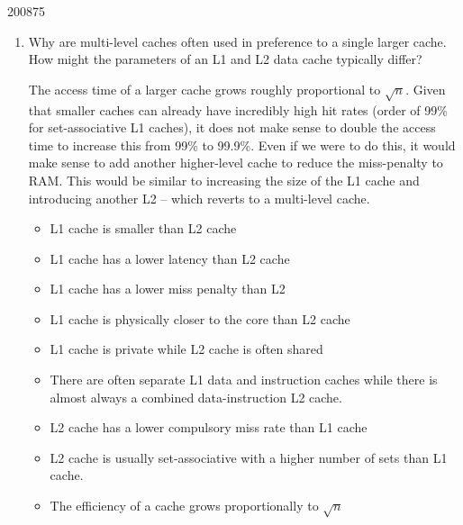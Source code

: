 \documentclass[10pt,\jkfside,a4paper]{article}
\begin{document}
\begin{examquestion}{2008}{7}{5}

\begin{enumerate}[label=(\alph*)]

\item Why are multi-level caches often used in preference to a single larger
cache. How might the parameters of an L1 and L2 data cache typically differ?

The access time of a larger cache grows roughly proportional to $\sqrt{n}$.
Given that smaller caches can already have incredibly high hit rates
(order of 99\% for set-associative L1 caches), it does not make sense to double
the access time to increase this from 99\% to 99.9\%. Even if we were to do
this, it would make sense to add another higher-level cache to reduce the
miss-penalty to RAM. This would be similar to increasing the size of the L1
cache and introducing another L2 -- which reverts to a multi-level cache.

\begin{itemize}

\item L1 cache is smaller than L2 cache

\item L1 cache has a lower latency than L2 cache

\item L1 cache has a lower miss penalty than L2

\item L1 cache is physically closer to the core than L2 cache

\item L1 cache is private while L2 cache is often shared

\item There are often separate L1 data and instruction caches while there is
almost always a combined data-instruction L2 cache.

\item L2 cache has a lower compulsory miss rate than L1 cache

\item L2 cache is usually set-associative with a higher number of sets than
L1 cache.

\end{itemize}

\iffalse

\begin{itemize}

\item The efficiency of a cache grows proportionally to $\sqrt{n}$


\end{itemize}
\end{enumerate}
\end{examquestion}
\end{document}
